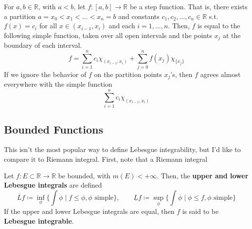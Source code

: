   \begin{example}
    For $a, b \in \mathbb{R}$, with $a < b$, let $f: [a, b] \longrightarrow \mathbb{R}$ be a step function. That is, there exists a partition $a = x_0 < x_1 < \ldots < x_n = b$ and constants $c_1, c_2, \ldots, c_n \in \mathbb{R}$ s.t. $f(x) = c_i$ for all $x \in (x_{i-1}, x_i)$ and each $i = 1, \ldots, n$. Then, $f$ is equal to the following simple function, taken over all open intervals and the points $x_j$ at the boundary of each interval. 
    \begin{equation}
      f = \sum_{i=1}^n c_i \chi_{(x_{i-1}, x_i)} + \sum_{j=0}^n f(x_j) \chi_{\{x_j\}}
    \end{equation}
    If we ignore the behavior of $f$ on the partition points $x_j$'s, then $f$ agrees almost everywhere with the simple function 
    \begin{equation}
      \sum_{i=1}^n c_i \chi_{(x_{i-1}, x_i)}
    \end{equation}
  \end{example} 

\subsection{Bounded Functions} 

  This isn't the most popular way to define Lebesgue integrability, but I'd like to compare it to Riemann integral. First, note that a Riemann integral 

  \begin{definition}
    Let $f: E \subset \mathbb{R} \to \mathbb{R}$ be bounded, with $m(E) < +\infty$. Then, the \textbf{upper and lower Lebesgue integrals} are defined 
    \begin{equation}
      \overline{L} f \coloneqq \inf_{\phi} \bigg\{ \int \phi \; \bigg| \; f \leq \phi, \phi \text{ simple} \bigg\}, \qquad \underline{L} f \coloneqq \sup_{\phi} \bigg\{ \int \phi \; \bigg| \; \phi \leq f, \phi \text{ simple} \bigg\}
    \end{equation}
    If the upper and lower Lebesgue integrals are equal, then $f$ is said to be \textbf{Lebesgue integrable}.
  \end{definition}

